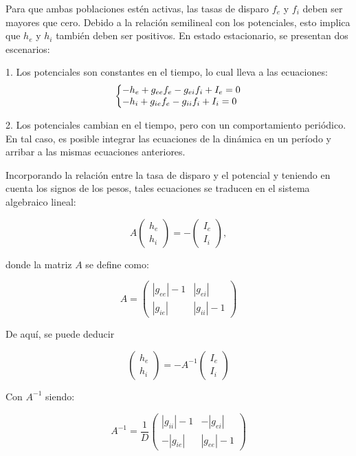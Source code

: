 \documentclass[aps,prb,twocolumn,superscriptaddress,floatfix,longbibliography]{revtex4-2}
\begin{document}
Para que ambas poblaciones estén activas, las tasas de disparo \(f_e\) y \(f_i\) deben ser mayores que cero. Debido a la relación semilineal con los potenciales, esto implica que \(h_e\) y \(h_i\) también deben ser positivos. En estado estacionario, se presentan dos escenarios:

1. Los potenciales son constantes en el tiempo, lo cual lleva a las ecuaciones:
\[
\left\{\begin{array}{@{}l@{}}
    -h_e + g_{ee} f_e - g_{ei} f_i + I_e = 0 \\
    -h_i + g_{ie} f_e - g_{ii} f_i + I_i = 0
    \end{array}\right.
\]
    
2. Los potenciales cambian en el tiempo, pero con un comportamiento periódico. En tal caso, es posible integrar las ecuaciones de la dinámica en un período y arribar a las mismas ecuaciones anteriores.

Incorporando la relación entre la tasa de disparo y el potencial y teniendo en cuenta los signos de los pesos, tales ecuaciones se traducen en el sistema algebraico lineal:

\[ A \begin{pmatrix} h_e \\ h_i \end{pmatrix} = - \begin{pmatrix} I_e \\ I_i \end{pmatrix}, \]

donde la matriz \(A\) se define como:

\[ A = \begin{pmatrix} |g_{ee}| - 1 & |g_{ei}| \\ |g_{ie}| & |g_{ii}| - 1 \end{pmatrix} \]

De aquí, se puede deducir

\[ \begin{pmatrix} h_e \\ h_i \end{pmatrix} = - A^{-1} \begin{pmatrix} I_e \\ I_i \end{pmatrix} \]

Con \(A^{-1}\) siendo:

\[ A^{-1} = \frac{1}{D} \begin{pmatrix} |g_{ii}| - 1 & -|g_{ei}| \\ -|g_{ie}| & |g_{ee}| - 1 \end{pmatrix} \]
\end{document}
